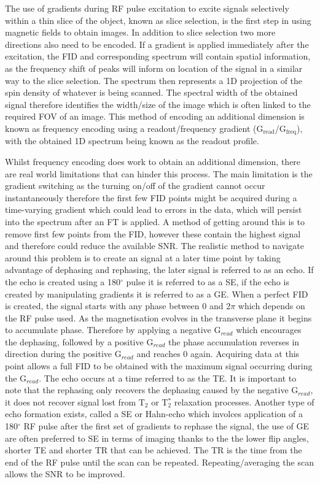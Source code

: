 The use of gradients during \ac{RF} pulse excitation to excite signals selectively within a thin slice of the object, known as slice selection, is the first step in using magnetic fields to obtain images. In addition to slice selection two more directions also need to be encoded. If a gradient is applied immediately after the excitation, the \ac{FID} and corresponding spectrum will contain spatial information, as the frequency shift of peaks will inform on location of the signal in a similar way to the slice selection. The spectrum then represents a 1D projection of the spin density of whatever is being scanned. The spectral width of the obtained signal therefore identifies the width/size of the image which is often linked to the required \ac{FOV} of an image. This method of encoding an additional dimension is known as frequency encoding using a readout/frequency gradient (G$_{\textrm{read}}$/G$_{\textrm{freq}}$), with the obtained 1D spectrum being known as the readout profile.

Whilst frequency encoding does work to obtain an additional dimension, there are real world limitations that can hinder this process. The main limitation is the gradient switching as the turning on/off of the gradient cannot occur instantaneously therefore the first few \ac{FID} points might be acquired during a time-varying gradient which could lead to errors in the data, which will persist into the spectrum after an \ac{FT} is applied. A method of getting around this is to remove first few points from the \ac{FID}, however these contain the highest signal and therefore could reduce the available \ac{SNR}. The realistic method to navigate around this problem is to create an signal at a later time point by taking advantage of dephasing and rephasing, the later signal is referred to as an echo. If the echo is created using a 180$^\circ$ pulse it is referred to as a \ac{SE}, if the echo is created by manipulating gradients it is referred to as a \ac{GE}. When a perfect \ac{FID} is created, the signal starts with any phase between 0 and 2$\pi$ which depends on the \ac{RF} pulse used. As the magnetisation evolves in the transverse plane it begins to accumulate phase. Therefore by applying a negative G$_{read}$ which encourages the dephasing, followed by a positive G$_{read}$ the phase accumulation reverses in direction during the positive G$_{read}$ and reaches 0 again. Acquiring data at this point allows a full \ac{FID} to be obtained with the maximum signal occurring during the G$_{read}$. The echo occurs at a time referred to as the \ac{TE}. It is important to note that the rephasing only recovers the dephasing caused by the negative G$_{read}$, it does not recover signal lost from T$_2$ or T$_2^*$ relaxation processes. Another type of echo formation exists, called a \ac{SE} or Hahn-echo \cite{Hahn1950SpinEchoes} which involces application of a 180$^\circ$ \ac{RF} pulse after the first set of gradients to rephase the signal, the use of \ac{GE} are often preferred to SE in terms of imaging thanks to the the lower flip angles, shorter \ac{TE} and shorter \ac{TR} that can be achieved. The \ac{TR} is the time from the end of the \ac{RF} pulse until the scan can be repeated. Repeating/averaging the scan allows the \ac{SNR} to be improved.

